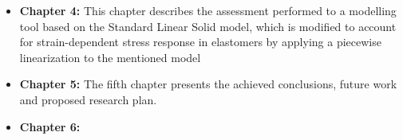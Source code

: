 \begin{itemize}
    \item {\bf Chapter 4: } This chapter describes the assessment performed to a modelling tool based on the Standard Linear Solid model, which is modified to account for strain-dependent stress response in elastomers by applying a piecewise linearization to the mentioned model
    \item {\bf Chapter 5: } The fifth chapter presents the achieved conclusions, future work and proposed research plan.
    \item {\bf Chapter 6: }
\end{itemize}